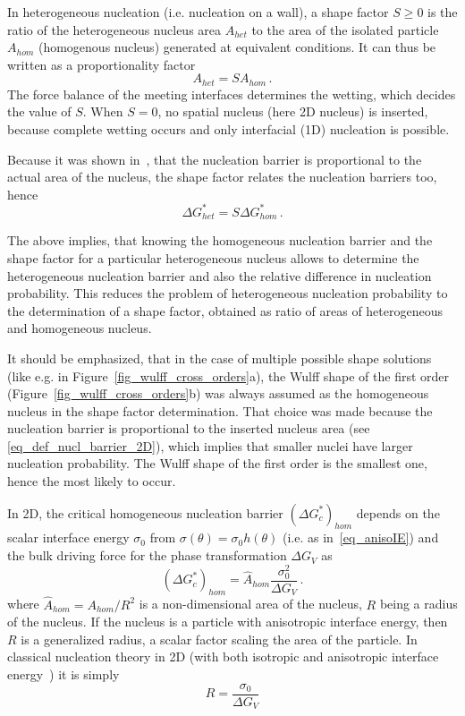 In heterogeneous nucleation (i.e. nucleation on a wall), a shape factor $S\geq0$ is the ratio of the heterogeneous nucleus area $A_{het}$ to the area of the isolated particle $A_{hom}$ (homogenous nucleus) generated at equivalent conditions. It can thus be written as a proportionality factor
\begin{equation}
	A_{het} = SA_{hom} \,.
\end{equation}
The force balance of the meeting interfaces determines the wetting, which decides the value of $S$. When $S=0$, no spatial nucleus (here 2D nucleus) is inserted, because complete wetting occurs and only interfacial (1D) nucleation is possible.

Because it was shown in~\cite{Mariaux2011}, that the nucleation barrier is proportional to the actual area of the nucleus, the shape factor relates the nucleation barriers too, hence
\begin{equation}
	\Delta G^*_{het} = S\Delta G^*_{hom} \,.
\end{equation}

The above implies, that knowing the homogeneous nucleation barrier and the shape factor for a particular heterogeneous nucleus allows to determine the heterogeneous nucleation barrier and also the relative difference in nucleation probability. This reduces the problem of heterogeneous nucleation probability to the determination of a shape factor, obtained as ratio of areas of heterogeneous and homogeneous nucleus. 

It should be emphasized, that in the case of multiple possible shape solutions (like e.g. in Figure~\ref{fig_wulff_cross_orders}a), the Wulff shape of the first order (Figure~\ref{fig_wulff_cross_orders}b) was always assumed as the homogeneous nucleus in the shape factor determination. That choice was made because the nucleation barrier is proportional to the inserted nucleus area (see \eqref{eq_def_nucl_barrier_2D}), which implies that smaller nuclei have larger nucleation probability. The Wulff shape of the first order is the smallest one, hence the most likely to occur.

In 2D, the critical homogeneous nucleation barrier $(\Delta G_c^*)_{hom}$ depends on the scalar interface energy $\sigma_0$ from $\sigma(\theta)=\sigma_0 h(\theta)$ (i.e. as in~\eqref{eq_anisoIE}) and the bulk driving force for the phase transformation $\Delta G_V$ as
\begin{equation} \label{eq_def_nucl_barrier_2D}
	(\Delta G_c^*)_{hom} = \hat{A}_{hom}\frac{\sigma_0^2}{\Delta G_V}\,.
\end{equation}
where $\hat{A}_{hom}=A_{hom}/R^2$ is a non-dimensional area of the nucleus, $R$ being a radius of the nucleus. If the nucleus is a particle with anisotropic interface energy, then $R$ is a generalized radius, a scalar factor scaling the area of the particle. In classical nucleation theory in 2D (with both isotropic and anisotropic interface energy~\cite{Mariaux2011}) it is simply
\begin{equation}
	R = \frac{\sigma_0}{\Delta G_V}
\end{equation}

